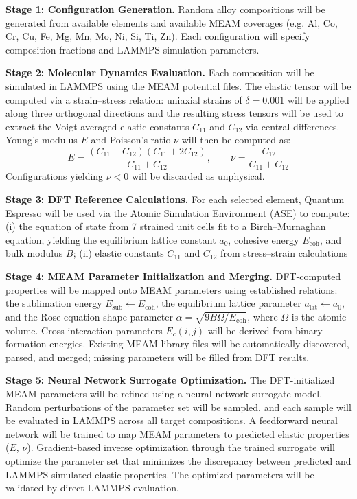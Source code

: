 \documentclass{phys400proposal}
\begin{document}
\textbf{Stage 1: Configuration Generation.}
Random alloy compositions will be generated from available elements and available MEAM coverages (e.g. Al, Co, Cr, Cu, Fe, Mg, Mn, Mo, Ni, Si, Ti, Zn). Each configuration will specify composition fractions and LAMMPS simulation parameters.

\textbf{Stage 2: Molecular Dynamics Evaluation.}
Each composition will be simulated in LAMMPS \citep{thompson2022} using the MEAM potential files. The elastic tensor will be computed via a strain--stress relation: uniaxial strains of $\delta = 0.001$ will be applied along three orthogonal directions and the resulting stress tensors will be used to extract the Voigt-averaged\citep{voigt} elastic constants $C_{11}$ and $C_{12}$ via central differences. Young's modulus $E$ and Poisson's ratio $\nu$ will then be computed as:
\begin{equation}
	E = \frac{(C_{11} - C_{12})(C_{11} + 2C_{12})}{C_{11} + C_{12}}, \qquad \nu = \frac{C_{12}}{C_{11} + C_{12}}
	\label{eq:elastic}
\end{equation}
Configurations yielding $\nu < 0$ will be discarded as unphysical.

\textbf{Stage 3: DFT Reference Calculations.}
For each selected element, Quantum Espresso \citep{giannozzi2009} will be used via the Atomic Simulation Environment (ASE) to compute: (i) the equation of state from 7 strained unit cells fit to a Birch--Murnaghan\citep{birch} equation, yielding the equilibrium lattice constant $a_0$, cohesive energy $E_\mathrm{coh}$, and bulk modulus $B$; (ii) elastic constants $C_{11}$ and $C_{12}$ from stress--strain calculations

\textbf{Stage 4: MEAM Parameter Initialization and Merging.}
DFT-computed properties will be mapped onto MEAM parameters using established relations: the sublimation energy $E_\mathrm{sub} \leftarrow E_\mathrm{coh}$, the equilibrium lattice parameter $a_\mathrm{lat} \leftarrow a_0$, and the Rose equation shape parameter $\alpha = \sqrt{9B\Omega / E_\mathrm{coh}}$, where $\Omega$ is the atomic volume. Cross-interaction parameters $E_c(i,j)$ will be derived from binary formation energies. Existing MEAM library files will be automatically discovered, parsed, and merged; missing parameters will be filled from DFT results.

\textbf{Stage 5: Neural Network Surrogate Optimization.}
The DFT-initialized MEAM parameters will be refined using a neural network surrogate model. Random perturbations of the parameter set will be sampled, and each sample will be evaluated in LAMMPS across all target compositions. A feedforward neural network will be trained to map MEAM parameters to predicted elastic properties ($E$, $\nu$). Gradient-based inverse optimization through the trained surrogate will optimize the parameter set that minimizes the discrepancy between predicted and LAMMPS simulated elastic properties. The optimized parameters will be validated by direct LAMMPS evaluation.
\end{document}
